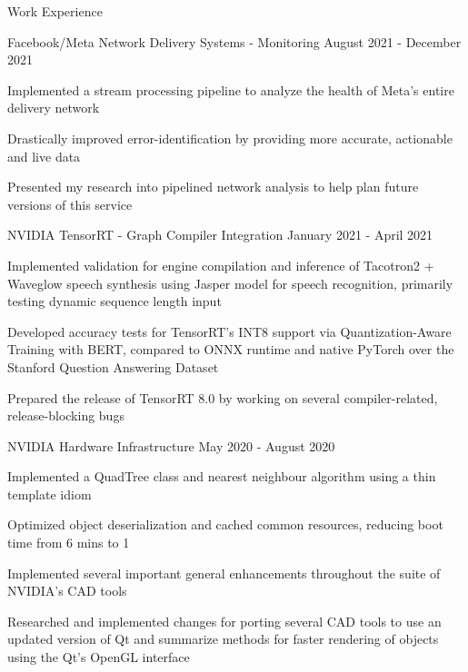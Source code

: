 \documentclass{resume} %
\begin{document}
\begin{rSection}{Work Experience}
    \begin{workexperience}
        {Facebook/Meta}
        {Network Delivery Systems - Monitoring}
        {August 2021 - December 2021}
        {
            \item Implemented a stream processing pipeline to analyze the health of Meta's entire delivery network
            \item Drastically improved error-identification by providing more accurate, actionable and live data
            \item Presented my research into pipelined network analysis to help plan future versions of this service
        }
    \end{workexperience}

    \begin{workexperience}
        {NVIDIA}
        {TensorRT - Graph Compiler Integration}
        {January 2021 - April 2021}
        {
            \item Implemented validation for engine compilation and inference of Tacotron2 + Waveglow speech synthesis using Jasper model for speech recognition, primarily testing dynamic sequence length input
            \item Developed accuracy tests for TensorRT's INT8 support via Quantization-Aware Training with BERT, compared to ONNX runtime and native PyTorch over the Stanford Question Answering Dataset
            \item Prepared the release of TensorRT 8.0 by working on several compiler-related, release-blocking bugs
        }
    \end{workexperience}
    \begin{workexperience}
        {NVIDIA}
        {Hardware Infrastructure}
        {May 2020 - August 2020}
        {
            \item Implemented a QuadTree class and nearest neighbour algorithm using a thin template idiom
            \item Optimized object deserialization and cached common resources, reducing boot time from 6 mins to 1
            \item Implemented several important general enhancements throughout the suite of NVIDIA's CAD tools
            \item Researched and implemented changes for porting several CAD tools to use an updated version of Qt and summarize methods for faster rendering of objects using the Qt's OpenGL interface
        }
    \end{workexperience}
    

\end{rSection}
\end{document}
